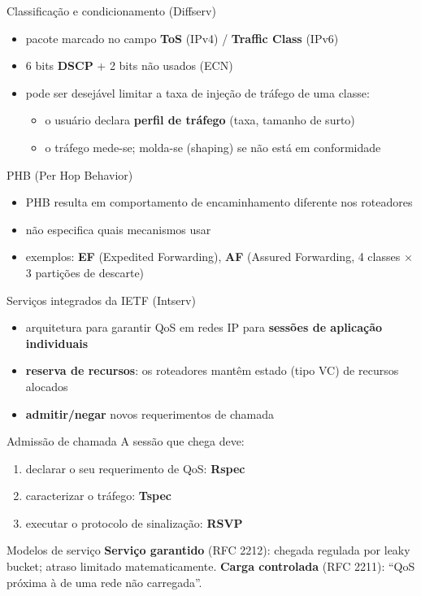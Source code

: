 \documentclass[aspectratio=169,11pt]{beamer}
\begin{document}
\begin{frame}{Classificação e condicionamento (Diffserv)}
  \begin{itemize}
    \item pacote marcado no campo \textbf{ToS} (IPv4) / \textbf{Traffic Class} (IPv6)
    \item 6 bits \textbf{DSCP} + 2 bits não usados (ECN)
    \item pode ser desejável limitar a taxa de injeção de tráfego de uma classe:
      \begin{itemize}
        \item o usuário declara \textbf{perfil de tráfego} (taxa, tamanho de surto)
        \item o tráfego mede-se; molda-se (shaping) se não está em conformidade
      \end{itemize}
  \end{itemize}
  \begin{block}{PHB (Per Hop Behavior)}
    \begin{itemize}
      \item PHB resulta em comportamento de encaminhamento diferente nos roteadores
      \item não especifica quais mecanismos usar
      \item exemplos: \textbf{EF} (Expedited Forwarding), \textbf{AF} (Assured Forwarding, 4 classes $\times$ 3 partições de descarte)
    \end{itemize}
  \end{block}
\end{frame}

\begin{frame}{Serviços integrados da IETF (Intserv)}
  \begin{itemize}
    \item arquitetura para garantir QoS em redes IP para \textbf{sessões de aplicação individuais}
    \item \textbf{reserva de recursos}: os roteadores mantêm estado (tipo VC) de recursos alocados
    \item \textbf{admitir/negar} novos requerimentos de chamada
  \end{itemize}
  \begin{block}{Admissão de chamada}
    A sessão que chega deve:
    \begin{enumerate}
      \item declarar o seu requerimento de QoS: \textbf{Rspec}
      \item caracterizar o tráfego: \textbf{Tspec}
      \item executar o protocolo de sinalização: \textbf{RSVP}
    \end{enumerate}
  \end{block}
  \begin{exampleblock}{Modelos de serviço}
    \textbf{Serviço garantido} (RFC 2212): chegada regulada por leaky bucket; atraso limitado matematicamente.
    \textbf{Carga controlada} (RFC 2211): ``QoS próxima à de uma rede não carregada''.
  \end{exampleblock}
\end{frame}
\end{document}
